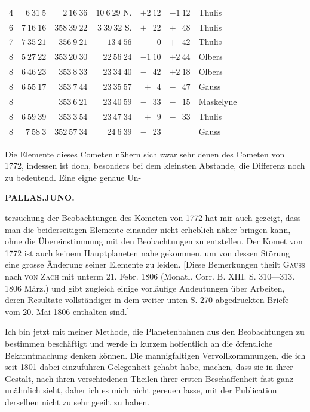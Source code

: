\begin{center}
\begin{tabular}{r|r|r|r|r|r|l}
4 & $6\ 31\ 5$ & $2\ 16\ 36$ & $10\ 6\ 29$ N. & $+2\ 12$ & $-1\ 12$ & Thulis\\
6 & $7\ 16\ 16$ & $358\ 39\ 22$ & $3\ 39\ 32$ S. & $+\phantom{1}\ 22$ & $+\phantom{1}\ 48$ & Thulis\\
7 & $7\ 35\ 21$ & $356\ 9\ 21$ & $13\ 4\ 56$ & $\phantom{+1}\ 0$ & $+\phantom{1}\ 42$ & Thulis\\
8 & $5\ 27\ 22$ & $353\ 20\ 30$ & $22\ 56\ 24$ & $-1\ 10$ & $+2\ 44$ & Olbers\\
8 & $6\ 46\ 23$ & $353\ 8\ 33$ & $23\ 34\ 40$ & $-\phantom{1}\ 42$ & $+2\ 18$ & Olbers\\
8 & $6\ 55\ 17$ & $353\ 7\ 44$ & $23\ 35\ 57$ & $+\phantom{1}\ 4$ & $-\phantom{1}\ 47$ & Gauss\\
8 & & $353\ 6\ 21$ & $23\ 40\ 59$ & $-\phantom{1}\ 33$ & $-\phantom{1}\ 15$ & Maskelyne\\
8 & $6\ 59\ 39$ & $353\ 3\ 54$ & $23\ 47\ 34$ & $+\phantom{1}\ 9$ & $-\phantom{1}\ 33$ & Thulis\\
8 & $7\ 58\ 3$ & $352\ 57\ 34$ & $24\ 6\ 39$ & $-\phantom{1}\ 23$ & & Gauss\\
\end{tabular}\endgroup
\end{center}

\par\indent Die Elemente dieses Cometen nähern sich zwar sehr denen des Cometen von 1772, indessen ist doch, besonders bei dem kleinsten Abstande, die Differenz noch zu bedeutend. Eine eigne genaue Un-
\par\clearpage
\thispagestyle{empty}
\noindent{}%
\makebox[12mm][l]{}%
\parbox[t]{\dimexpr\linewidth-24mm\relax}{\centering\footnotesize\bfseries PALLAS.\quad JUNO.\par}%
\par\nobreak\medskip
\noindent tersuchung der Beobachtungen des Kometen von 1772 hat mir auch gezeigt, dass man die beiderseitigen Elemente einander nicht erheblich näher bringen kann, ohne die Übereinstimmung mit den Beobachtungen zu entstellen. Der Komet von 1772 ist auch keinem Hauptplaneten nahe gekommen, um von dessen Störung eine grosse Änderung seiner Elemente zu leiden. [Diese Bemerkungen theilt \textsc{Gauss} nach \textsc{von Zach} mit unterm 21. Febr. 1806 (Monatl. Corr. B. XIII. S. 310—313. 1806 März.) und gibt zugleich einige vorläufige Andeutungen über Arbeiten, deren Resultate vollständiger in dem weiter unten S. 270 abgedruckten Briefe vom 20. Mai 1806 enthalten sind.]

\par\indent Ich bin jetzt mit meiner Methode, die Planetenbahnen aus den Beobachtungen zu bestimmen beschäftigt und werde in kurzem hoffentlich an die öffentliche Bekanntmachung denken können. Die mannigfaltigen Vervollkommnungen, die ich seit 1801 dabei einzuführen Gelegenheit gehabt habe, machen, dass sie in ihrer Gestalt, nach ihren verschiedenen Theilen ihrer ersten Beschaffenheit fast ganz unähnlich sieht, daher ich es mich nicht gereuen lasse, mit der Publication derselben nicht zu sehr geeilt zu haben.

